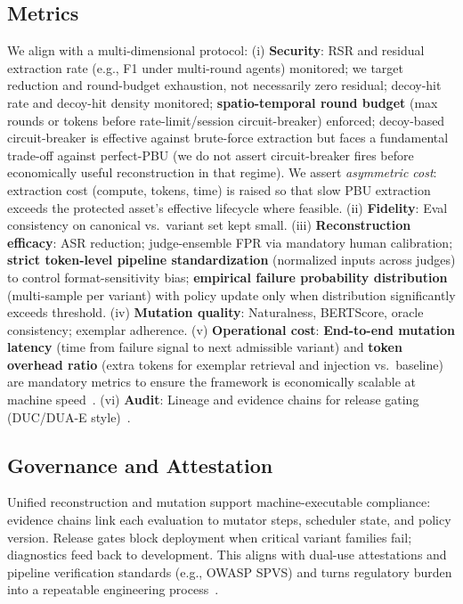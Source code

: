 \documentclass[letterpaper,twocolumn,10pt]{article}
\begin{document}
\subsection{Metrics}

We align with a multi-dimensional protocol: (i) \textbf{Security}: RSR and residual extraction rate (e.g., F1 under multi-round agents) monitored; we target reduction and round-budget exhaustion, not necessarily zero residual; decoy-hit rate and decoy-hit density monitored; \textbf{spatio-temporal round budget} (max rounds or tokens before rate-limit/session circuit-breaker) enforced; decoy-based circuit-breaker is effective against brute-force extraction but faces a fundamental trade-off against perfect-PBU (we do not assert circuit-breaker fires before economically useful reconstruction in that regime). We assert \emph{asymmetric cost}: extraction cost (compute, tokens, time) is raised so that slow PBU extraction exceeds the protected asset's effective lifecycle where feasible. (ii) \textbf{Fidelity}: Eval consistency on canonical vs.\ variant set kept small. (iii) \textbf{Reconstruction efficacy}: ASR reduction; judge-ensemble FPR via mandatory human calibration; \textbf{strict token-level pipeline standardization} (normalized inputs across judges) to control format-sensitivity bias; \textbf{empirical failure probability distribution} (multi-sample per variant) with policy update only when distribution significantly exceeds threshold. (iv) \textbf{Mutation quality}: Naturalness, BERTScore, oracle consistency; exemplar adherence. (v) \textbf{Operational cost}: \textbf{End-to-end mutation latency} (time from failure signal to next admissible variant) and \textbf{token overhead ratio} (extra tokens for exemplar retrieval and injection vs.\ baseline) are mandatory metrics to ensure the framework is economically scalable at machine speed~\cite{ControlledMutation_SafetyEval}. (vi) \textbf{Audit}: Lineage and evidence chains for release gating (DUC/DUA-E style)~\cite{dual-use-attestations,ControlledMutation_SafetyEval}.

\subsection{Governance and Attestation}

Unified reconstruction and mutation support machine-executable compliance: evidence chains link each evaluation to mutator steps, scheduler state, and policy version. Release gates block deployment when critical variant families fail; diagnostics feed back to development. This aligns with dual-use attestations and pipeline verification standards (e.g., OWASP SPVS) and turns regulatory burden into a repeatable engineering process~\cite{ControlledMutation_SafetyEval}.
\end{document}
